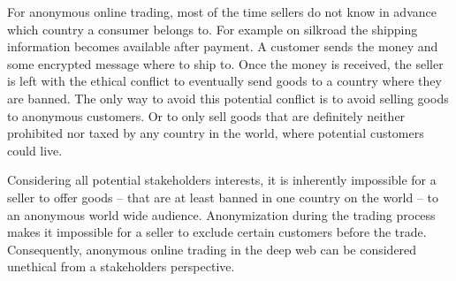 For anonymous online trading, most of the time sellers do not know in advance which country a consumer belongs to. For example on silkroad the shipping information becomes available after payment. A customer sends the money and some encrypted message where to ship to\cite{silkroad2013}. Once the money is received, the seller is left with the ethical conflict to eventually send goods to a country where they are banned. The only way to avoid this potential conflict is to avoid selling goods to anonymous customers. Or to only sell goods that are definitely neither prohibited nor taxed by any country in the world, where potential customers could live.

Considering all potential stakeholders interests, it is inherently impossible for a seller to offer goods -- that are at least banned in one country on the world -- to an anonymous world wide audience. Anonymization during the trading process makes it impossible for a seller to exclude certain customers before the trade. Consequently, anonymous online trading in the deep web can be considered unethical from a stakeholders perspective.